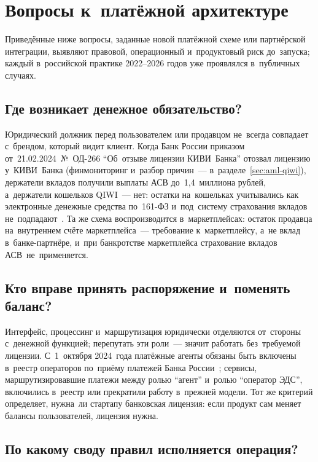 \section{Вопросы к~платёжной архитектуре}\label{sec:regulation-checklist}

Приведённые ниже вопросы, заданные новой платёжной схеме или партнёрской интеграции,
выявляют правовой, операционный и~продуктовый риск до~запуска; каждый
в~российской практике 2022--2026 годов уже проявлялся в~публичных случаях.

\subsection*{Где возникает денежное обязательство?}

Юридический должник перед пользователем или продавцом не~всегда совпадает
с~брендом, который видит клиент. Когда Банк России приказом
от~21.02.2024~№~ОД-266 \enquote{Об~отзыве лицензии КИВИ~Банка} отозвал лицензию у~КИВИ~Банка (финмониторинг
и~разбор причин~--- в~разделе~\ref{sec:aml-qiwi}), держатели вкладов получили выплаты
АСВ до~1{,}4~миллиона рублей, а~держатели кошельков QIWI~--- нет: остатки
на~кошельках учитывались как электронные денежные средства по~161-ФЗ
и~под~систему страхования вкладов
не~подпадают~\cite{cbr-qiwi-license-2024,fz-161}. Та же схема воспроизводится
в~маркетплейсах: остаток продавца на~внутреннем счёте маркетплейса~---
требование к~маркетплейсу, а~не вклад в~банке-партнёре, и~при банкротстве
маркетплейса страхование вкладов АСВ~не~применяется.

\subsection*{Кто вправе принять распоряжение и~поменять баланс?}

Интерфейс, процессинг и~маршрутизация юридически отделяются от~стороны
с~денежной функцией; перепутать эти роли~--- значит работать без~требуемой
лицензии. С~1~октября 2024~года платёжные агенты обязаны быть включены в~реестр
операторов по~приёму платежей Банка России~\cite{fz-103,cbr-opp-register};
сервисы, маршрутизировавшие платежи между ролью \enquote{агент} и~ролью
\enquote{оператор ЭДС}, включились в~реестр или прекратили работу в~прежней
модели. Тот же критерий определяет, нужна~ли стартапу банковская лицензия: если
продукт сам меняет балансы пользователей, лицензия нужна.

\subsection*{По какому своду правил исполняется операция?}

